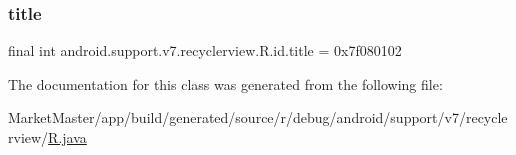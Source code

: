 \subsubsection{\texorpdfstring{title}{title}}
{\footnotesize\ttfamily final int android.\+support.\+v7.\+recyclerview.\+R.\+id.\+title = 0x7f080102\hspace{0.3cm}{\ttfamily [static]}}



The documentation for this class was generated from the following file\+:\begin{DoxyCompactItemize}
\item 
Market\+Master/app/build/generated/source/r/debug/android/support/v7/recyclerview/\mbox{\hyperlink{debug_2android_2support_2v7_2recyclerview_2R_8java}{R.\+java}}\end{DoxyCompactItemize}
